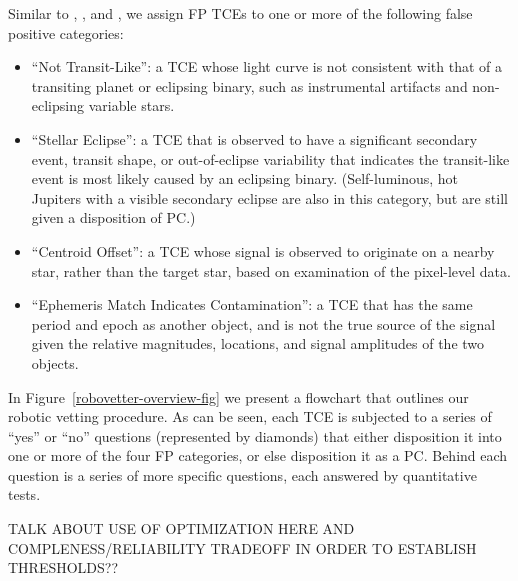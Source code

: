 Similar to \citet{Rowe2015a}, \citep{Mullally2015cat}, and \citet{Coughlin2016}, we assign FP TCEs to one or more of the following false positive categories:


\begin{itemize}
  \item ``Not Transit-Like'': a TCE whose light curve is not consistent with that of a transiting planet or eclipsing binary, such as instrumental artifacts and non-eclipsing variable stars.
  \item ``Stellar Eclipse'': a TCE that is observed to have a significant secondary event, transit shape, or out-of-eclipse variability that indicates the transit-like event is most likely caused by an eclipsing binary. (Self-luminous, hot Jupiters with a visible secondary eclipse are also in this category, but are still given a disposition of PC.)
  \item ``Centroid Offset'': a TCE whose signal is observed to originate on a nearby star, rather than the target star, based on examination of the pixel-level data.
  \item ``Ephemeris Match Indicates Contamination'': a TCE that has the same period and epoch as another object, and is not the true source of the signal given the relative magnitudes, locations, and signal amplitudes of the two objects.
\end{itemize}

\noindent In Figure~\ref{robovetter-overview-fig} we present a flowchart that outlines our robotic vetting procedure. As can be seen, each TCE is subjected to a series of ``yes'' or ``no'' questions (represented by diamonds) that either disposition it into one or more of the four FP categories, or else disposition it as a PC. Behind each question is a series of more specific questions, each answered by quantitative tests. 


TALK ABOUT USE OF OPTIMIZATION HERE AND COMPLENESS/RELIABILITY TRADEOFF IN ORDER TO ESTABLISH THRESHOLDS??





